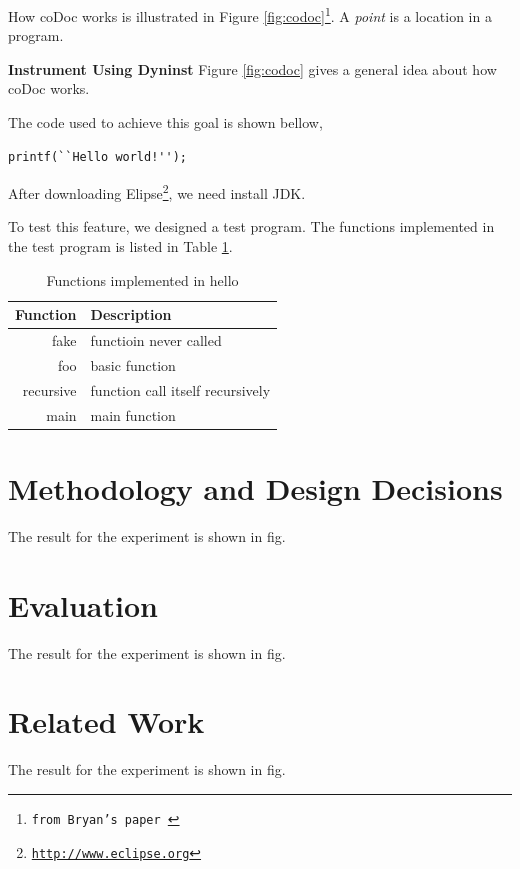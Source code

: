 \documentclass[11pt,letterpaper,oneside]{article}
\begin{document}
How coDoc works is illustrated in Figure \ref{fig:codoc}\footnote{\texttt{from Bryan's paper \cite{xiao_automated_2012}}}. 
A \emph{point} is a location in a program.

\noindent \newline\textbf{Instrument Using Dyninst}\newline
\indent Figure \ref{fig:codoc} gives a general idea about how coDoc works.

The code used to achieve this goal is shown bellow,
\begin{Verbatim}[frame=single]
printf(``Hello world!'');
\end{Verbatim}


After downloading Elipse\footnote{\texttt{\url{http://www.eclipse.org}}}, we need install JDK.

To test this feature, we designed a test program. 
The functions implemented in the test program is listed in Table \ref{table:functions}.

\begin{table}[th]
\caption{Functions implemented in hello}
\centering
\begin{tabular}{rl}
\hline
Function & Description \\
\hline
fake & functioin never called \\
foo  & basic function \\
recursive & function call itself recursively \\
main & main function \\
\hline
\end{tabular}
\label{table:functions}
\end{table}

\section{Methodology and Design Decisions}
\label{sec:decision}
The result for the experiment is shown in fig.

\section{Evaluation}
\label{sec:evaluation}
The result for the experiment is shown in fig.

\section{Related Work}
\label{sec:related}
The result for the experiment is shown in fig.
\end{document}
